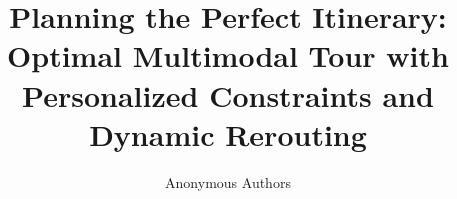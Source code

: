 \documentclass[sigconf,anonymous,review]{acmart}
\newcommand{\ignore}[1]{}
\begin{document}
\title
{Planning the Perfect Itinerary: Optimal Multimodal Tour with  Personalized Constraints and Dynamic Rerouting}

\renewcommand{\shorttitle}{Planning the Perfect Itinerary}


\author{Anonymous Authors}

\ignore{

\author{Neelu Lalchandani}
\affiliation{%
  \institution{Dept. of Computer Science and Engineering}
  \city{IIT Kanpur}
  \country{India}
  \email{@iitk.ac.in}
}

\author{Priyanshu Jha}
\affiliation{%
  \institution{Dept. of Computer Science and Engineering}
  \city{IIT Kanpur}
  \country{India}
  \email{@iitk.ac.in}
}

\author{Shubhadip Mitra}
\affiliation{%
  \institution{Blue Yonder India Pvt. Ltd.}
  \city{Bengaluru}
  \country{India}
  \email{shubhadip.mitra@blueyonder.com}
}

\author{Arindam Pal}
\affiliation{%
  \institution{TechSoftX Corporation}
  \city{Sydney}
  \state{NSW}
  \country{Australia}
  \email{arindamp@techsoftx.com.au}
}

\author{Oswald Christopher}
\affiliation{%
  \institution{Dept. of Computer Science and Engineering}
  \city{NIT Tiruchirappalli}
  \country{India}
  \email{oswald@nitt.edu}
}

\author{Arnab Bhattacharya}
\affiliation{%
  \institution{Dept. of Computer Science and Engineering}
  \city{IIT Kanpur}
  \country{India}
  \email{arnabb@iitk.ac.in}
}

}





\end{document}
